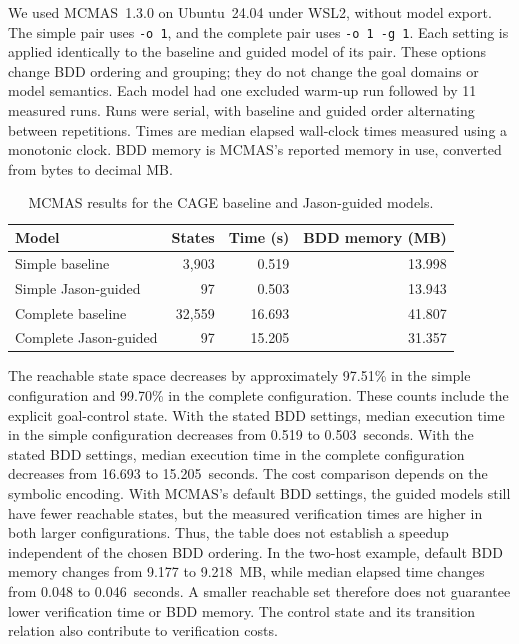 \documentclass[runningheads]{llncs}
\begin{document}
We used MCMAS~1.3.0 on Ubuntu~24.04 under WSL2, without model export.
The simple pair uses \texttt{-o 1}, and the complete pair uses
\texttt{-o 1 -g 1}. Each setting is applied identically to the baseline
and guided model of its pair. These options change BDD ordering and
grouping; they do not change the goal domains or model semantics.
Each model had one excluded warm-up run followed by 11 measured runs.
Runs were serial, with baseline and guided order alternating between
repetitions. Times are median elapsed wall-clock times measured using
a monotonic clock. BDD memory is MCMAS's reported memory in use,
converted from bytes to decimal MB.

\begin{table}[H]
\caption{MCMAS results for the CAGE baseline and Jason-guided models.}
\label{tab:runtime}
\centering
\small
\setlength{\tabcolsep}{3pt}
\begin{tabular}{lrrr}
\hline
Model & States & Time (s) & BDD memory (MB) \\
\hline
Simple baseline & 3,903 & 0.519 & 13.998 \\
Simple Jason-guided & 97 & 0.503 & 13.943 \\
Complete baseline & 32,559 & 16.693 & 41.807 \\
Complete Jason-guided & 97 & 15.205 & 31.357 \\
\hline
\end{tabular}
\end{table}

The reachable state space decreases by approximately 97.51\%
in the simple configuration and 99.70\% in the complete
configuration. These counts include the explicit goal-control state.
With the stated BDD settings, median execution time in the simple
configuration decreases from 0.519 to 0.503~seconds.
With the stated BDD settings, median execution time in the complete
configuration decreases from 16.693 to 15.205~seconds.
The cost comparison depends on the symbolic encoding. With MCMAS's
default BDD settings, the guided models still have fewer reachable
states, but the measured verification times are higher in both larger
configurations. Thus, the table does not establish a speedup independent
of the chosen BDD ordering.
In the two-host example, default BDD memory changes from 9.177
to 9.218~MB, while median elapsed time changes
from 0.048 to 0.046~seconds.
A smaller reachable set therefore does not guarantee lower verification
time or BDD memory. The control state and its transition relation also
contribute to verification costs.
\end{document}
